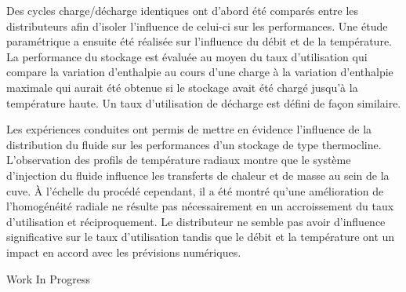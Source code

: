 {Des cycles charge/décharge identiques ont d'abord été comparés entre les distributeurs afin d'isoler l'influence de celui-ci sur les performances. Une étude paramétrique a ensuite été réalisée sur l'influence du débit et de la température. La performance du stockage est évaluée au moyen du taux d'utilisation qui compare la variation d'enthalpie au cours d'une charge à la variation d'enthalpie maximale qui aurait été obtenue si le stockage avait été chargé jusqu'à la température haute. Un taux d'utilisation de décharge est défini de façon similaire. 







Les expériences conduites ont permis de mettre en évidence l'influence de la distribution du fluide sur les performances d'un stockage de type thermocline. L'observation des profils de température radiaux montre que le système d'injection du fluide influence les transferts de chaleur et de masse au sein de la cuve. À l'échelle du procédé cependant, il a été montré qu'une amélioration de l'homogénéité radiale ne résulte pas nécessairement en un accroissement du taux d'utilisation et réciproquement. Le distributeur ne semble pas avoir d'influence significative sur le taux d'utilisation tandis que le débit et la température ont un impact en accord avec les prévisions numériques.

 \vfill Work In Progress

}
 
